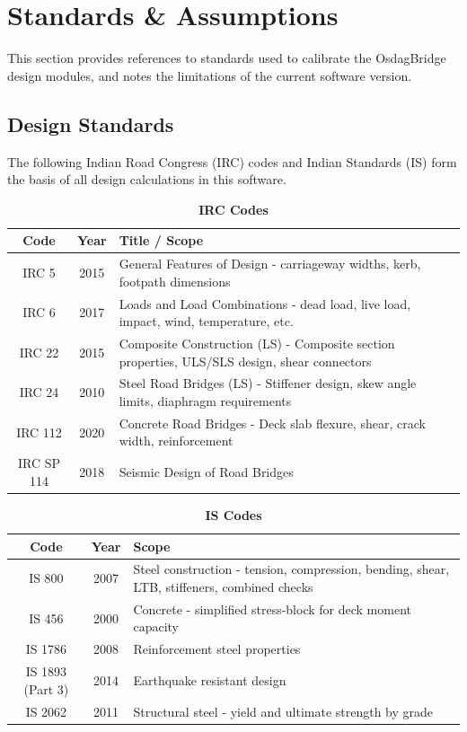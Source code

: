 \documentclass[12pt,a4paper]{report}
\numberwithin{table}{chapter}
\numberwithin{figure}{chapter}
\begin{document}
\chapter{Standards \& Assumptions}
\label{ch:Design Standards}

This section provides references to standards used to calibrate the OsdagBridge
design modules, and notes the limitations of the current software version.

\section{Design Standards}
\label{sec:design_standards}

The following Indian Road Congress (IRC) codes and Indian Standards (IS) 
form the basis of all design calculations in this software.

\vspace{0.5cm}

\begingroup
\setlength{\tabcolsep}{3pt}
\begin{table}[H]
\caption{\textbf{IRC Codes}}
\begin{tabular}{|c|c|p{13cm}|}
\hline
\textbf{Code} & \textbf{Year} & \textbf{Title / Scope} \\ 
\hline
IRC 5 & 2015 & General Features of Design - carriageway widths, kerb, footpath dimensions \\ 
\hline
IRC 6 & 2017 & Loads and Load Combinations - dead load, live load, impact, wind, temperature, etc. \\ 
\hline
IRC 22 & 2015 & Composite Construction (LS) - Composite section properties, ULS/SLS design, shear connectors \\ 
\hline
IRC 24 & 2010 & Steel Road Bridges (LS) - Stiffener design, skew angle limits, diaphragm requirements \\ 
\hline
IRC 112 & 2020 & Concrete Road Bridges - Deck slab flexure, shear, crack width, reinforcement \\ 
\hline
IRC SP 114 & 2018 & Seismic Design of Road Bridges \\ 
\hline
\end{tabular}
\end{table}

\setlength{\tabcolsep}{3pt}
\begin{table}[H]
\caption{\textbf{IS Codes}}
\begin{tabular}{|c|c|p{13cm}|}
\hline
\textbf{Code} & \textbf{Year} & \textbf{Scope} \\
\hline
IS 800 & 2007 & Steel construction - tension, compression, bending, shear, LTB, stiffeners, combined checks \\
\hline
IS 456 & 2000 & Concrete - simplified stress-block for deck moment capacity \\
\hline
IS 1786 & 2008 & Reinforcement steel properties \\
\hline
IS 1893 (Part 3) & 2014 & Earthquake resistant design \\
\hline
IS 2062 & 2011 & Structural steel - yield and ultimate strength by grade \\
\hline
\end{tabular}
\end{table}
\end{document}
